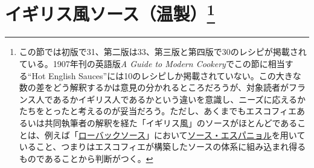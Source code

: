 \href{未、原文対照チェック}{} \href{未、日本語表現校正}{}
\href{未、その他修正}{} \href{未、原稿最終校正}{}

\hypertarget{ux30a4ux30aeux30eaux30b9ux98a8ux30bdux30fcux30b9ux6e29ux88fd24}{%
\section[イギリス風ソース（温製）]{\texorpdfstring{イギリス風ソース（温製）\footnote{この節では初版で31、第二版は33、第三版と第四版で30のレシピが掲載されている。1907年刊の英語版\emph{A
  Guide to Modern Cookery}でこの節に相当する``Hot English
  Sauces''には10のレシピしか掲載されていない。この大きな数の差をどう解釈するかは意見の分かれるところだろうが、対象読者がフランス人であるかイギリス人であるかという違いを意識し、ニーズに応えるかたちをとったと考えるのが妥当だろう。ただし、あくまでもエスコフィエあるいは共同執筆者の解釈を経た「イギリス風」のソースがほとんどであることは、例えば「\protect\hyperlink{roe-buck-sauce}{ローバックソース}」において\protect\hyperlink{sauce-espagnole}{ソース・エスパニョル}を用いていること、つまりはエスコフィエが構築したソースの体系に組み込まれ得るものであることから判断がつく。}}{イギリス風ソース（温製）}}\label{ux30a4ux30aeux30eaux30b9ux98a8ux30bdux30fcux30b9ux6e29ux88fd24}}


